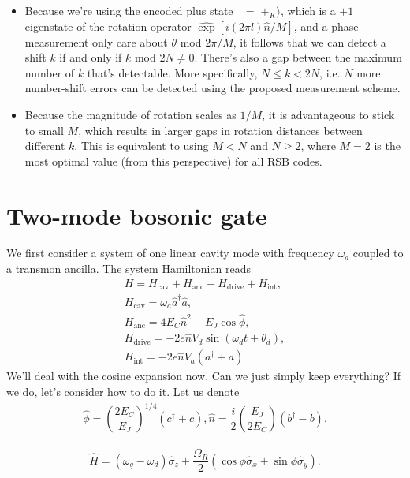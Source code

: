 \documentclass{article}
\DeclareMathOperator{\psianc}{|\Psi_{\text{anc}}\rangle}
\begin{document}
\begin{itemize}
    \item[\textcolor{blue}{A1.}] Because we're using the encoded plus state $\psianc=|+_K\rangle$, which is a $+1$ eigenstate of the rotation operator $\widehat{\exp}[i(2\pi l)\hat{n}/M]$, and a phase measurement only care about $\theta$ mod $2\pi/M$, it follows that we can detect a shift $k$ if and only if $k$ mod $2N\neq 0$. There's also a gap between the maximum number of $k$ that's detectable. More specifically, $N \leq k<2N$, i.e. $N$ more number-shift errors can be detected using the proposed measurement scheme.     
    \item[\textcolor{blue}{A2.}] Because the magnitude of rotation scales as $1/M$, it is advantageous to stick to small $M$, which results in larger gaps in rotation distances between different $k$. This is equivalent to using $M<N$ and $N\geq 2$, where $M=2$ is the most optimal value (from this perspective) for all RSB codes.  
\end{itemize}

\section{Two-mode bosonic gate}
We first consider a system of one linear cavity mode with frequency $\omega_a$ coupled to a transmon ancilla. The system Hamiltonian reads
\begin{align}
    H = H_{\text{cav}} + H_{\text{anc}} + H_{\text{drive}} + H_{\text{int}},\\
    H_{\text{cav}} = \omega_a \hat{a}^\dagger \hat{a},\\
    H_{\text{anc}} = 4E_C\hat{n}^2 - E_J\cos\hat{\phi},\\
    H_{\text{drive}} = -2e\hat{n}V_d \sin(\omega_d t + \theta_{d}),\\
    H_{\text{int}} = -2e\hat{n}V_a(a^\dagger + a)  
\end{align}
We'll deal with the cosine expansion now. Can we just simply keep everything? If we do, let's consider how to do it. Let us denote 
\begin{align}
    \hat{\phi} = \left(\dfrac{2E_C}{E_J}\right)^{1/4}(c^\dagger +c),
    \hat{n} = \dfrac{i}{2}\left(\dfrac{E_J}{2E_C}\right)(b^\dagger - b).
\end{align}

\begin{align}\label{eqn:singlegate}\displaystyle
    \hat{H}= (\omega_q-\omega_d)\hat{\sigma}_z+\dfrac{\Omega_R}{2}\left(\cos\phi\hat{\sigma}_x+\sin\phi\hat{\sigma}_y\right).
\end{align}


\end{document}
